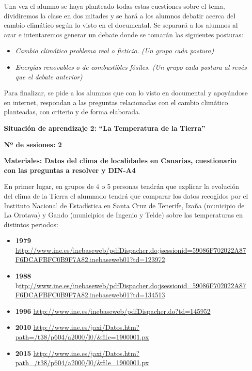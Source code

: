 \documentclass[
]{article}
\providecommand{\tightlist}{%
  \setlength{\itemsep}{0pt}\setlength{\parskip}{0pt}}
\begin{document}
Una vez el alumno se haya planteado todas estas cuestiones sobre el
tema, dividiremos la clase en dos mitades y se hará a los alumnos
debatir acerca del cambio climático según lo visto en el documental. Se
separará a los alumnos al azar e intentaremos generar un debate donde se
tomarán las siguientes posturas:

\begin{itemize}
\tightlist
\item
  \emph{Cambio climático problema real o ficticio. (Un grupo cada
  postura)}
\item
  \emph{Energías renovables o de combustibles fósiles. (Un grupo cada
  postura al revés que el debate anterior)}
\end{itemize}

Para finalizar, se pide a los alumnos que con lo visto en documental y
apoyándose en internet, respondan a las preguntas relacionadas con el
cambio climático planteadas, con criterio y de forma elaborada.

\textbf{Situación de aprendizaje 2: ``La Temperatura de la Tierra''}

\textbf{Nº de sesiones: 2}

\textbf{Materiales: Datos del clima de localidades en Canarias,
cuestionario con las preguntas a resolver y DIN-A4}

En primer lugar, en grupos de 4 o 5 personas tendrán que explicar la
evolución del clima de la Tierra el alumnado tendrá que comparar los
datos recogidos por el Instituto Nacional de Estadística en Santa Cruz
de Tenerife, Izaña (municipio de La Orotava) y Gando (municipios de
Ingenio y Telde) sobre las temperaturas en distintos periodos:

\begin{itemize}
\tightlist
\item
  \textbf{1979}
  \url{http://www.ine.es/inebaseweb/pdfDispacher.do;jsessionid=59086F702022A87F6DCAFBFC0B9F7A82.inebaseweb01?td=123972}
\item
  \textbf{1988}
  h\href{http://www.ine.es/inebaseweb/pdfDispacher.do;jsessionid=59086F702022A87F6DCAFBFC0B9F7A82.inebaseweb01?td=134513}{ttp://www.ine.es/inebaseweb/pdfDispacher.do;jsessionid=59086F702022A87F6DCAFBFC0B9F7A82.inebaseweb01?td=134513}
\item
  \textbf{1996}
  \url{http://www.ine.es/inebaseweb/pdfDispacher.do?td=145952}
\item
  \textbf{2010}
  \url{http://www.ine.es/jaxi/Datos.htm?path=/t38/p604/a2000/l0/\&file=1900001.px}
\item
  \textbf{2015}
  \url{http://www.ine.es/jaxi/Datos.htm?path=/t38/p604/a2000/l0/\&file=1900001.px}
\end{itemize}
\end{document}
